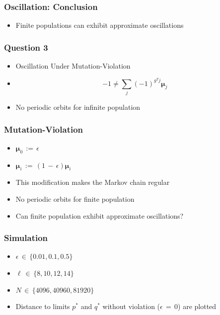 \documentclass[aspectratio=169]{beamer}
\begin{document}
  \begin{frame}
    \frametitle{Oscillation: Conclusion}
    \begin{itemize}
      \setlength\itemsep{1em}
      \item{Finite populations can exhibit approximate oscillations}             
    \end{itemize}
  \end{frame}
  
  \begin{frame}
    \frametitle{Question 3}
    \begin{itemize}
      \item{Oscillation Under Mutation-Violation}
      \item{
	\[
	  -1 \neq \sum \limits_{j} (-1)^{g^T j} \bm{\mu}_j      
	\]
      }
      \item{No periodic orbits for infinite population}      
    \end{itemize}
  \end{frame}
  
  \begin{frame}
    \frametitle{Mutation-Violation}
    \begin{itemize}
      \setlength\itemsep{1em}   
      \item{$\bm{\mu}_0 \,:=\, \epsilon$}
      \item{$\bm{\mu}_i \,:=\, (1 \,-\, \epsilon)\bm{\mu}_i$}
      \item{This modification makes the Markov chain regular}
      \item{No periodic orbits for finite population}      
      \item{Can finite population exhibit approximate oscillations?}
    \end{itemize}
  \end{frame}
  
  
  \begin{frame}
    \frametitle{Simulation}
    \begin{itemize}
      \setlength\itemsep{1em}
      \item{$\epsilon \,\in\, \{0.01, 0.1, 0.5\}$}      
      \item{$\ell \,\in\, \{8, 10, 12, 14\}$}
      \item{$N \,\in\, \{4096, 40960, 81920\}$}
      \item{Distance to limits $p^\ast$ and  $q^\ast$ without violation ($\epsilon \,=\, 0$) are plotted }
    \end{itemize}
  \end{frame}
  
\end{document}
